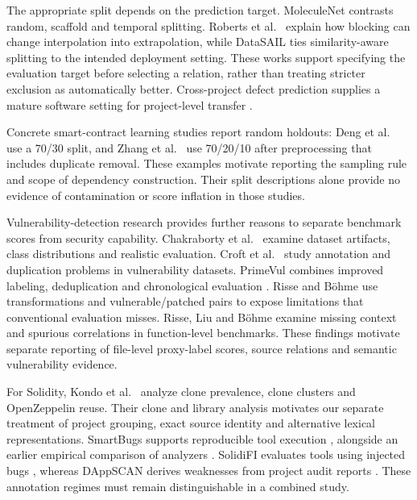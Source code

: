 \documentclass[preprint,12pt]{elsarticle}
\begin{document}
The appropriate split depends on the prediction target. MoleculeNet \cite{wu2018moleculenet} contrasts random, scaffold and temporal splitting. Roberts et al.~\cite{roberts2017cv} explain how blocking can change interpolation into extrapolation, while DataSAIL \cite{joeres2025datasail} ties similarity-aware splitting to the intended deployment setting. These works support specifying the evaluation target before selecting a relation, rather than treating stricter exclusion as automatically better. Cross-project defect prediction supplies a mature software setting for project-level transfer \cite{herbold2018cpdp}.

Concrete smart-contract learning studies report random holdouts: Deng et al.~\cite{deng2023multimodal} use a 70/30 split, and Zhang et al.~\cite{zhang2024heterogeneous} use 70/20/10 after preprocessing that includes duplicate removal. These examples motivate reporting the sampling rule and scope of dependency construction. Their split descriptions alone provide no evidence of contamination or score inflation in those studies.

Vulnerability-detection research provides further reasons to separate benchmark scores from security capability. Chakraborty et al.~\cite{chakraborty2022vulnerability} examine dataset artifacts, class distributions and realistic evaluation. Croft et al.~\cite{croft2023dataquality} study annotation and duplication problems in vulnerability datasets. PrimeVul combines improved labeling, deduplication and chronological evaluation \cite{ding2025primevul}. Risse and Böhme \cite{risse2024limits} use transformations and vulnerable/patched pairs to expose limitations that conventional evaluation misses. Risse, Liu and Böhme \cite{risse2025wrongexam} examine missing context and spurious correlations in function-level benchmarks. These findings motivate separate reporting of file-level proxy-label scores, source relations and semantic vulnerability evidence.

For Solidity, Kondo et al.~\cite{kondo2020cloning} analyze clone prevalence, clone clusters and OpenZeppelin reuse. Their clone and library analysis motivates our separate treatment of project grouping, exact source identity and alternative lexical representations. SmartBugs supports reproducible tool execution \cite{ferreira2020smartbugs}, alongside an earlier empirical comparison of analyzers \cite{durieux2020tools}. SolidiFI evaluates tools using injected bugs \cite{ghaleb2020solidifi}, whereas DAppSCAN derives weaknesses from project audit reports \cite{zheng2024dappscan}. These annotation regimes must remain distinguishable in a combined study.
\end{document}
